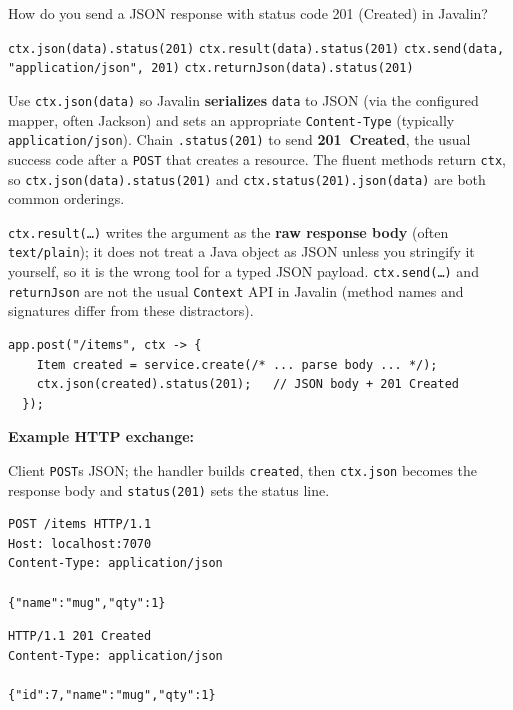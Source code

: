 \question[4]
How do you send a JSON response with status code 201 (Created) in Javalin?
\begin{choices}
  \CorrectChoice \texttt{ctx.json(data).status(201)}
  \choice \texttt{ctx.result(data).status(201)}
  \choice \texttt{ctx.send(data, "application/json", 201)}
  \choice \texttt{ctx.returnJson(data).status(201)}
\end{choices}
\begin{solution}
  Use \texttt{ctx.json(data)} so Javalin \textbf{serializes} \texttt{data} to JSON (via the configured mapper, often Jackson) and sets an appropriate \texttt{Content-Type} (typically \texttt{application/json}). Chain \texttt{.status(201)} to send \textbf{201~Created}, the usual success code after a \texttt{POST} that creates a resource. The fluent methods return \texttt{ctx}, so \texttt{ctx.json(data).status(201)} and \texttt{ctx.status(201).json(data)} are both common orderings.

  \texttt{ctx.result(\ldots)} writes the argument as the \textbf{raw response body} (often \texttt{text/plain}); it does not treat a Java object as JSON unless you stringify it yourself, so it is the wrong tool for a typed JSON payload. \texttt{ctx.send(\ldots)} and \texttt{returnJson} are not the usual \texttt{Context} API in Javalin (method names and signatures differ from these distractors).

  \begin{lstlisting}[style=java]
  app.post("/items", ctx -> {
    Item created = service.create(/* ... parse body ... */);
    ctx.json(created).status(201);   // JSON body + 201 Created
  });
  \end{lstlisting}

  \noindent\textbf{Example HTTP exchange:}\par
  \noindent Client \texttt{POST}s JSON; the handler builds \texttt{created}, then \texttt{ctx.json} becomes the response body and \texttt{status(201)} sets the status line.\par
  \begin{httpexchange}
\begin{lstlisting}[style=http]
POST /items HTTP/1.1
Host: localhost:7070
Content-Type: application/json

{"name":"mug","qty":1}
\end{lstlisting}
\httpmidarrows
\begin{lstlisting}[style=http]
HTTP/1.1 201 Created
Content-Type: application/json

{"id":7,"name":"mug","qty":1}
\end{lstlisting}
  \end{httpexchange}
\end{solution}

